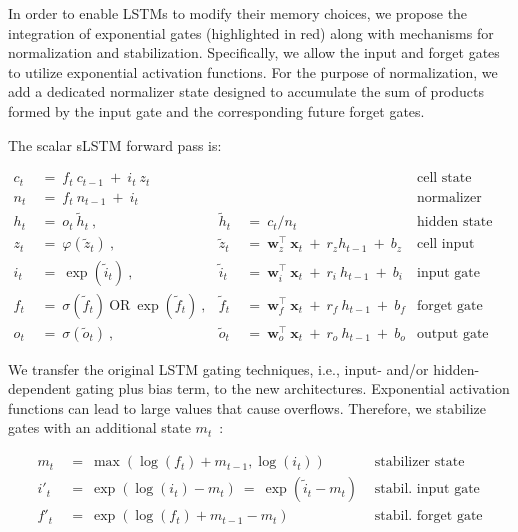 In order to enable LSTMs to modify their memory choices, we propose the integration of exponential gates (highlighted in red) along with mechanisms for normalization and stabilization. Specifically, we allow the input and forget gates to utilize exponential activation functions. For the purpose of normalization, we add a dedicated normalizer state designed to accumulate the sum of products formed by the input gate and the corresponding future forget gates.

The scalar sLSTM forward pass is:

\begin{align}
\label{eq:slstmforward}
c_t \ &= \  f_t \ c_{t-1} \ + \ i_t \ z_t & & 
 &\text{cell state} \\
n_t \ &= \  f_t \ n_{t-1} \ + \ i_t  & & 
 &\text{normalizer state} \\
h_t \ &= \ o_t \ \tilde{h}_t \ ,
  &\tilde{h}_t \ &= \ c_t / n_t
&\text{hidden state} \\
z_t \ &= \ \varphi \left( \tilde{z}_t \right) \ , 
  &\tilde{z}_t \ &=  \ \mathbf{w}^\top_{z} \ \mathbf{x}_t \ + \
  r_{z}  h_{t-1} \ + \  b_{z}
  &\text{cell input} \\
i_t \ &= \ \!\exp \left( \tilde{i}_t  \right) \ , 
  &\tilde{i}_t \ &= \ \mathbf{w}^\top_{i} \ \mathbf{x}_t \ + \
  r_{i}  \ h_{t-1} \ + \  b_{i}
  &\text{input gate} \\
f_t \ &= \ \sigma \left(  \tilde{f}_t \right) \ \text{OR} \
\!\exp \left(  \tilde{f}_t \right) \ ,
  &\tilde{f}_t \ &= \ \mathbf{w}^\top_{f} \ \mathbf{x}_t  \ + \
  r_{f}  \ h_{t-1} \ + \  b_{f}
  &\text{forget gate} \\
o_t \ &= \ \sigma \left( \tilde{o}_t \right) \ , 
  &\tilde{o}_t  \ &= \ \mathbf{w}^\top_{o} \ \mathbf{x}_t \ + \
  r_{o}  \ h_{t-1} \ + \  b_{o}
  &\text{output gate} 
\end{align}

We transfer the original LSTM gating techniques, i.e., input- and/or hidden-dependent gating plus bias term, to the new architectures. Exponential activation functions can lead to large values that cause overflows. Therefore, we stabilize gates with an additional state \mbox{$m_t$~\citep{Milakov:18arxiv}}:

\begin{align}
\label{eq:slstmstabil}
m_t \ &= \ \max \left( \log ( f_t ) + m_{t-1} , \log ( i_t ) \right) &\text{stabilizer state} \\
i'_t \ &= \ \!\exp \left( \log \left ( i_t \right) - m_t \right) \ = \ \!\exp \left( \tilde{i}_t - m_t \right) \ \, 
  &\text{stabil. input gate} \\
f'_t \ &= \ \!\exp \left( \log \left( f_t \right) + m_{t-1} - m_t \right) \ \, 
  &\text{stabil. forget gate}
\end{align}


